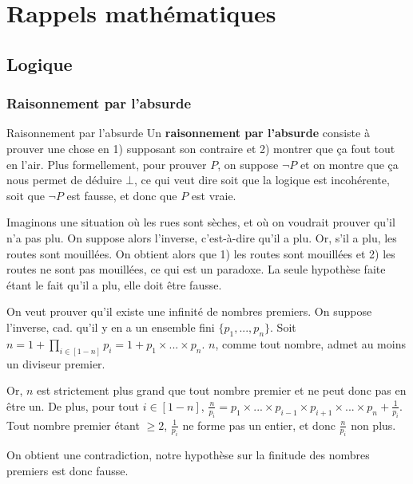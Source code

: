 
\chapter{Rappels mathématiques}


\section{Logique}

\subsection{Raisonnement par l'absurde}
\label{abs}

\begin{definition}{Raisonnement par l'absurde}{}
Un \textbf{raisonnement par l'absurde} consiste à prouver une chose en 1) supposant son contraire et 2) montrer que ça fout tout en l'air. Plus formellement, pour prouver $P$, on suppose $\neg P$ et on montre que ça nous permet de déduire $\bot$, ce qui veut dire soit que la logique est incohérente, soit que $\neg P$ est fausse, et donc que $P$ est vraie.
\end{definition}

\begin{example}
Imaginons une situation où les rues sont sèches, et où on voudrait prouver qu'il n'a pas plu. On suppose alors l'inverse, c'est-à-dire qu'il a plu. Or, s'il a plu, les routes sont mouillées. On obtient alors que 1) les routes sont mouillées et 2) les routes ne sont pas mouillées, ce qui est un paradoxe. La seule hypothèse faite étant le fait qu'il a plu, elle doit être fausse.
\end{example}

\begin{example}
On veut prouver qu'il existe une infinité de nombres premiers. On suppose l'inverse, cad. qu'il y en a un ensemble fini $\{p_1,...,p_n\}$. Soit $n = 1 + \prod_{i \in [1 - n]} p_i = 1 + p_1 \times ... \times p_n$. $n$, comme tout nombre, admet au moins un diviseur premier. 

Or, $n$ est strictement plus grand que tout nombre premier et ne peut donc pas en être un. De plus, pour tout $i \in [1 - n]$, $\frac{n}{p_i} = p_1 \times ... \times p_{i-1} \times p_{i+1} \times ... \times p_n + \frac{1}{p_i}$. Tout nombre premier étant $\geq 2$, $\frac{1}{p_i}$ ne forme pas un entier, et donc $\frac{n}{p_i}$ non plus.

On obtient une contradiction, notre hypothèse sur la finitude des nombres premiers est donc fausse.
\end{example}



